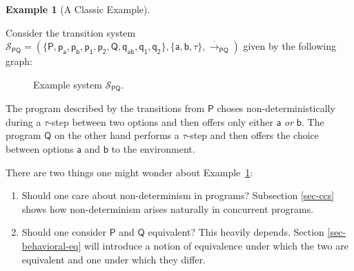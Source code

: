 \documentclass[
  a4paper,
]{report}
\providecommand{\tightlist}{%
  \setlength{\itemsep}{0pt}\setlength{\parskip}{0pt}}\usepackage{longtable,booktabs,array}
\theoremstyle{plain}
\theoremstyle{plain}
\theoremstyle{definition}
\theoremstyle{plain}
\theoremstyle{definition}
\newtheorem{example}{Example}[section]
\theoremstyle{remark}
\begin{document}
\begin{example}[A Classic
Example]\protect\hypertarget{exm-ts}{}\label{exm-ts}

Consider the transition system
\(\mathcal{S}_\mathsf{PQ} = (\{\mathsf{P}, \mathsf{p_a}, \mathsf{p_b}, \mathsf{p_1}, \mathsf{p_2}, \mathsf{Q}, \mathsf{q_{ab}}, \mathsf{q_1}, \mathsf{q_2}\}, \{\mathsf{a}, \mathsf{b}, τ\}, \xrightarrow{\cdot}_\mathsf{PQ})\)
given by the following graph:

\begin{figure}[H]


\caption{\label{fig-ts-determinism}Example system
\(\mathcal{S}_\mathsf{PQ}\).}

\end{figure}%

\noindent  The program described by the transitions from \(\mathsf{P}\)
choses non-deterministically during a \(τ\)-step between two options and
then offers only either \(\mathsf{a}\) \emph{or} \(\mathsf{b}\). The
program \(\mathsf{Q}\) on the other hand performs a \(τ\)-step and then
offers the choice between options \(\mathsf{a}\) and \(\mathsf{b}\) to
the environment.

\end{example}

\noindent  There are two things one might wonder about
Example~\ref{exm-ts}:

\begin{enumerate}
\def\labelenumi{\arabic{enumi}.}
\tightlist
\item
  Should one care about non-determinism in programs? Subsection
  \ref{sec-ccs} shows how non-determinism arises naturally in concurrent
  programs.
\item
  Should one consider \(\mathsf{P}\) and \(\mathsf{Q}\) equivalent? This
  heavily depends. Section \ref{sec-behavioral-eq} will introduce a
  notion of equivalence under which the two are equivalent and one under
  which they differ.
\end{enumerate}
\end{document}

